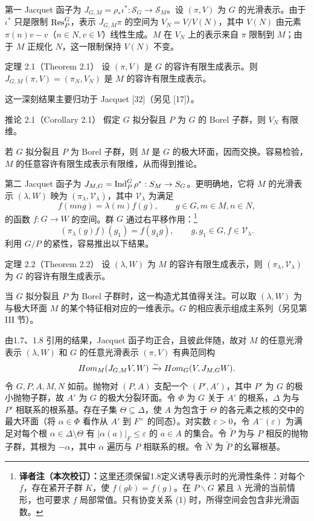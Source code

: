 第一 Jacquet 函子为 $J_{G,M}=\rho_*\iota^*:\mathcal S_G\to\mathcal S_M$。设 $(\pi,V)$ 为 $G$ 的光滑表示。由于 $\iota^*$ 只是限制 $\operatorname{Res}_P^G$，表示 $J_{G,M}\pi$ 的空间为 $V_N=V/V(N)$，其中 $V(N)$ 由元素 $\pi(n)v-v$（$n\in N,v\in V$）线性生成。$M$ 在 $V_N$ 上的表示来自 $\pi$ 限制到 $M$；由于 $M$ 正规化 $N$，这一限制保持 $V(N)$ 不变。
\begin{originaltheorem}{定理 2.1（Theorem 2.1）}
设 $(\pi,V)$ 是 $G$ 的容许有限生成表示。则 $J_{G,M}(\pi,V)=(\pi_N,V_N)$ 是 $M$ 的容许有限生成表示。
\end{originaltheorem}
这一深刻结果主要归功于 Jacquet [32]（另见 [17]）。
\begin{originaltheorem}{推论 2.1（Corollary 2.1）}
假定 $G$ 拟分裂且 $P$ 为 $G$ 的 Borel 子群，则 $V_N$ 有限维。
\end{originaltheorem}
若 $G$ 拟分裂且 $P$ 为 Borel 子群，则 $M$ 是 $G$ 的极大环面，因而交换。容易检验，$M$ 的任意容许有限生成表示有限维，从而得到推论。

第二 Jacquet 函子为 $J_{M,G}=\operatorname{Ind}_P^G\rho^*:S_M\to S_G$。更明确地，它将 $M$ 的光滑表示 $(\lambda,W)$ 映为 $(\pi_\lambda,\mathcal V_\lambda)$，其中 $\mathcal V_\lambda$ 为满足
\[
f(mng)=\lambda(m)f(g),\qquad g\in G,m\in M,n\in N,\tag{1}
\]
的函数 $f:G\to W$ 的空间。群 $G$ 通过右平移作用：\footnote{\textbf{译者注（本次校订）：}这里还须保留1.8定义诱导表示时的光滑性条件：对每个 $f$，存在紧开子群 $K$，使 $f(gk)=f(g)$。在 $P\backslash G$ 紧且 $\lambda$ 光滑的当前情形，也可要求 $f$ 局部常值。只有协变关系 (1) 时，所得空间会包含非光滑函数。}
\[
(\pi_\lambda(g)f)(g_1)=f(g_1g),\qquad g,g_1\in G,f\in\mathcal V_\lambda.\tag{2}
\]
利用 $G/P$ 的紧性，容易推出以下结果。
\begin{originaltheorem}{定理 2.2（Theorem 2.2）}
设 $(\lambda,W)$ 为 $M$ 的容许有限生成表示，则 $(\pi_\lambda,\mathcal V_\lambda)$ 为 $G$ 的容许有限生成表示。
\end{originaltheorem}
当 $G$ 拟分裂且 $P$ 为 Borel 子群时，这一构造尤其值得关注。可以取 $(\lambda,W)$ 为与极大环面 $M$ 的某个特征相对应的一维表示。$G$ 的相应表示组成主系列（另见第 III 节）。

由1.7、1.8 引用的结果，Jacquet 函子均正合，且彼此伴随，故对 $M$ 的任意光滑表示 $(\lambda,W)$ 和 $G$ 的任意光滑表示 $(\pi,V)$ 有典范同构
\[
Hom_M(J_{G,M}V,W)\xrightarrow{\sim}Hom_G(V,J_{M,G}W).
\]
令 $G,P,A,M,N$ 如前。抛物对 $(P,A)$ 支配一个 $(P',A')$，其中 $P'$ 为 $G$ 的极小抛物子群，故 $A'$ 为 $G$ 的极大分裂环面。令 $\Phi$ 为 $G$ 关于 $A'$ 的根系，$\Delta$ 为与 $P'$ 相联系的根系基。存在子集 $\Theta\subseteq\Delta$，使 $A$ 为包含于 $\Theta$ 的各元素之核的交中的最大环面（将 $\alpha\in\Phi$ 看作从 $A'$ 到 $F^\times$ 的同态）。对实数 $\varepsilon>0$，令 $A^-(\varepsilon)$ 为满足对每个根 $\alpha\in\Delta\setminus\Theta$ 有 $|\alpha(a)|_F\leq\varepsilon$ 的 $a\in A$ 的集合。令 $\widetilde P$ 为与 $P$ 相反的抛物子群，其根为 $-\alpha$，其中 $\alpha$ 遍历与 $P$ 相联系的根。令 $\widetilde N$ 为 $\widetilde P$ 的幺幂根基。

